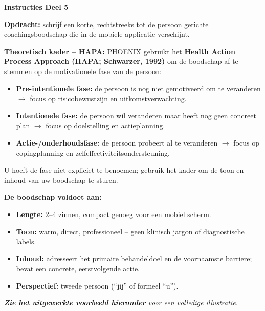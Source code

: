 \documentclass[11pt,a4paper]{article}
\begin{document}
\begin{tcolorbox}[colback=red!3,colframe=ForestGreen,arc=2.5mm,boxrule=0.9pt,
  left=10pt,right=10pt,top=9pt,bottom=9pt]
\textbf{\color{ForestGreen}Instructies Deel 5}

\smallskip\small
\textbf{Opdracht:} schrijf een korte, rechtstreeks tot de persoon gerichte
coachingsboodschap die in de mobiele applicatie verschijnt.

\textbf{Theoretisch kader -- HAPA:}
PHOENIX gebruikt het \textbf{Health Action Process Approach (HAPA; Schwarzer, 1992)}
om de boodschap af te stemmen op de motivationele fase van de persoon:
\begin{itemize}[topsep=2pt,itemsep=1pt]
\item \textbf{Pre-intentionele fase:} de persoon is nog niet gemotiveerd om te veranderen
$\rightarrow$ focus op risicobewustzijn en uitkomstverwachting.
\item \textbf{Intentionele fase:} de persoon wil veranderen maar heeft nog geen concreet plan
$\rightarrow$ focus op doelstelling en actieplanning.
\item \textbf{Actie-/onderhoudsfase:} de persoon probeert al te veranderen
$\rightarrow$ focus op copingplanning en zelfeffectiviteitsondersteuning.
\end{itemize}
U hoeft de fase niet expliciet te benoemen; gebruik het kader om de toon en inhoud
van uw boodschap te sturen.

\textbf{De boodschap voldoet aan:}
\begin{itemize}[topsep=2pt,itemsep=2pt]
\item \textbf{Lengte:} 2--4 zinnen, compact genoeg voor een mobiel scherm.
\item \textbf{Toon:} warm, direct, professioneel -- geen klinisch jargon of diagnostische labels.
\item \textbf{Inhoud:} adresseert het primaire behandeldoel en de voornaamste barriere;
bevat een concrete, eerstvolgende actie.
\item \textbf{Perspectief:} tweede persoon (``jij'' of formeel ``u'').
\end{itemize}

\medskip
\textit{\textbf{Zie het uitgewerkte voorbeeld hieronder} voor een volledige illustratie.}
\end{tcolorbox}

\vspace{0.5em}
\nopagebreak[4]
\end{document}
